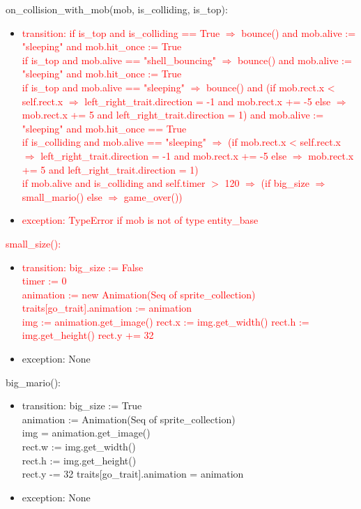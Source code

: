 \documentclass[12pt]{article}
\begin{document}
on\_collision\_with\_mob(mob, is\_colliding, is\_top):
\begin{itemize}
    \item \textcolor{red}{transition: if is\_top and is\_colliding == True $\Rightarrow$ bounce() and mob.alive := "sleeping" and mob.hit\_once := True\\
    if is\_top and mob.alive == "shell\_bouncing" $\Rightarrow$ bounce() and mob.alive := "sleeping" and mob.hit\_once := True\\
    if is\_top and mob.alive == "sleeping" $\Rightarrow$ bounce() and (if mob.rect.x < self.rect.x $\Rightarrow$ left\_right\_trait.direction = -1 and mob.rect.x += -5 else $\Rightarrow$ mob.rect.x += 5 and left\_right\_trait.direction = 1) and mob.alive := "sleeping" and mob.hit\_once == True\\
    if is\_colliding and mob.alive == "sleeping" $\Rightarrow$ (if mob.rect.x < self.rect.x $\Rightarrow$ left\_right\_trait.direction = -1 and mob.rect.x += -5 else $\Rightarrow$ mob.rect.x += 5 and left\_right\_trait.direction = 1)\\
    if mob.alive and is\_colliding and self.timer $>$ 120 $\Rightarrow$ (if big\_size $\Rightarrow$ small\_mario() else $\Rightarrow$ game\_over())}
    \item \textcolor{red}{exception: TypeError if mob is not of type entity\_base}
\end{itemize}

\color{red}
\textcolor{red}{small\_size():}
\begin{itemize}
    \item \textcolor{red}{transition: big\_size := False\\
    timer := 0\\
    animation := new Animation(Seq of sprite\_collection)\\
    traits[go\_trait].animation := animation\\
    img := animation.get\_image()
    rect.x := img.get\_width()
    rect.h := img.get\_height()
    rect.y += 32} 
    \item exception: None
\end{itemize}

big\_mario():
\begin{itemize}
    \item transition: big\_size := True\\
    animation := Animation(Seq of sprite\_collection)\\
    img = animation.get\_image()\\
    rect.w := img.get\_width()\\
    rect.h := img.get\_height()\\
    rect.y -= 32
    traits[go\_trait].animation = animation
    \item exception: None
\end{itemize}
\end{document}
